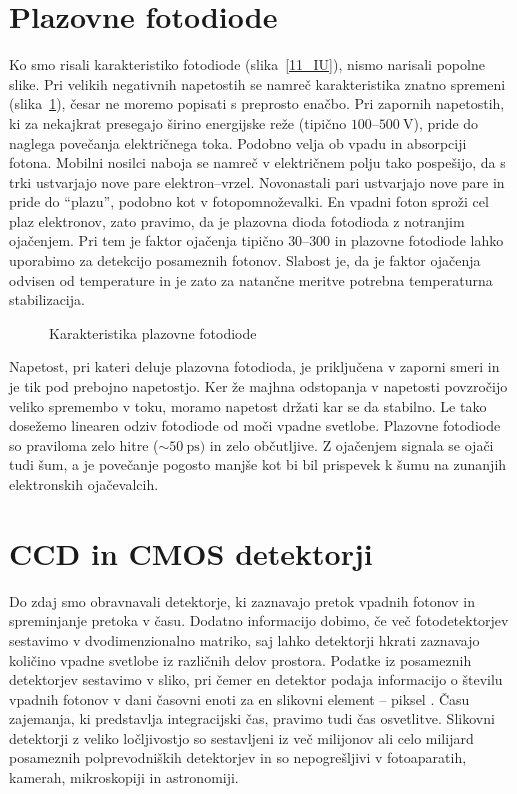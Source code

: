\section{Plazovne fotodiode}
Ko smo risali karakteristiko fotodiode (slika~\ref{11_IU}), 
nismo narisali popolne slike.
Pri velikih negativnih napetostih se namreč karakteristika znatno spremeni (slika~\ref{11_plaz}), 
česar ne moremo popisati s preprosto enačbo. Pri zapornih napetostih, ki za nekajkrat presegajo 
širino energijske reže (tipično $100$--$500~\si{\volt}$), 
pride do naglega povečanja električnega toka. Podobno velja ob vpadu in absorpciji fotona. 
Mobilni nosilci naboja se namreč v električnem polju tako pospešijo, da s trki ustvarjajo nove pare 
elektron--vrzel. Novonastali pari  ustvarjajo nove pare in pride do ``plazu'', podobno kot v 
fotopomnoževalki. En vpadni foton sproži cel plaz elektronov, zato pravimo, da je plazovna dioda
fotodioda z notranjim ojačenjem. Pri tem je faktor ojačenja tipično $30$--$300$ 
in plazovne fotodiode lahko 
uporabimo za detekcijo posameznih fotonov. Slabost je, da je faktor ojačenja odvisen od
temperature in je zato za natančne meritve potrebna temperaturna stabilizacija.
\begin{figure}[h]
\centering
\def\svgwidth{70truemm} 

\caption{Karakteristika plazovne fotodiode}
\label{11_plaz}
\end{figure}

Napetost, pri kateri deluje plazovna fotodioda, je priključena v zaporni smeri 
in je tik pod prebojno napetostjo. Ker že  majhna odstopanja v napetosti povzročijo veliko
spremembo v toku, moramo napetost držati kar se da stabilno. Le tako dosežemo 
linearen odziv fotodiode od moči vpadne svetlobe. Plazovne fotodiode so praviloma zelo hitre 
($\sim 50~\si{\pico\second})$ in zelo občutljive. Z ojačenjem signala se ojači tudi šum, a je 
povečanje pogosto manjše kot bi bil prispevek k šumu na zunanjih elektronskih ojačevalcih. 

\section{CCD in CMOS detektorji}
Do zdaj smo obravnavali detektorje, 
ki zaznavajo pretok vpadnih fotonov in spreminjanje
pretoka v času. Dodatno informacijo dobimo, če več fotodetektorjev sestavimo v 
dvodimenzionalno matriko, saj lahko detektorji hkrati zaznavajo količino vpadne svetlobe 
iz različnih delov prostora. Podatke iz posameznih detektorjev sestavimo v sliko, pri čemer 
en detektor podaja informacijo o številu vpadnih fotonov 
v dani časovni enoti za en slikovni element -- piksel . Času zajemanja, ki
predstavlja integracijski čas, pravimo tudi čas osvetlitve.  
Slikovni detektorji z veliko ločljivostjo so sestavljeni iz 
več milijonov ali celo milijard posameznih polprevodniških detektorjev in so 
nepogrešljivi v fotoaparatih, kamerah, mikroskopiji in astronomiji.

